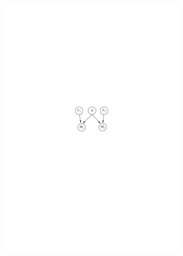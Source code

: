 \documentclass{article}
\begin{document}
\begin{figure}
\begin{subfigure}[t]{0.3\textwidth}
        \centering
        \includegraphics[scale = 0.6]{Figure/14-22(ii).pdf}
        \caption{}
        \label{14.22(ii)}
    \end{subfigure}
    \begin{subfigure}[t]{0.3\textwidth}
        \centering

\end{subfigure}
\end{figure}
\end{document}
